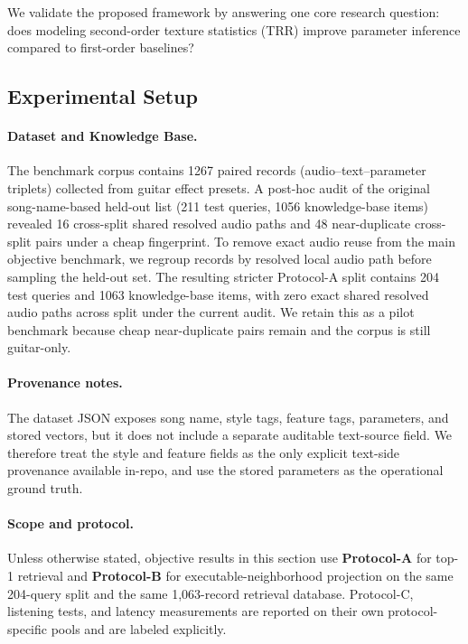 We validate the proposed framework by answering one core research question: does modeling second-order texture statistics (TRR) improve parameter inference compared to first-order baselines?

\subsection{Experimental Setup}

\paragraph{Dataset and Knowledge Base.}
The benchmark corpus contains 1267 paired records (audio--text--parameter triplets) collected from guitar effect presets. A post-hoc audit of the original song-name-based held-out list (211 test queries, 1056 knowledge-base items) revealed 16 cross-split shared resolved audio paths and 48 near-duplicate cross-split pairs under a cheap fingerprint. To remove exact audio reuse from the main objective benchmark, we regroup records by resolved local audio path before sampling the held-out set. The resulting stricter Protocol-A split contains 204 test queries and 1063 knowledge-base items, with zero exact shared resolved audio paths across split under the current audit. We retain this as a pilot benchmark because cheap near-duplicate pairs remain and the corpus is still guitar-only.

\paragraph{Provenance notes.}
The dataset JSON exposes song name, style tags, feature tags, parameters, and stored vectors, but it does not include a separate auditable text-source field. We therefore treat the style and feature fields as the only explicit text-side provenance available in-repo, and use the stored parameters as the operational ground truth.

\paragraph{Scope and protocol.}
Unless otherwise stated, objective results in this section use \textbf{Protocol-A} for top-1 retrieval and \textbf{Protocol-B} for executable-neighborhood projection on the same 204-query split and the same 1,063-record retrieval database. Protocol-C, listening tests, and latency measurements are reported on their own protocol-specific pools and are labeled explicitly.

